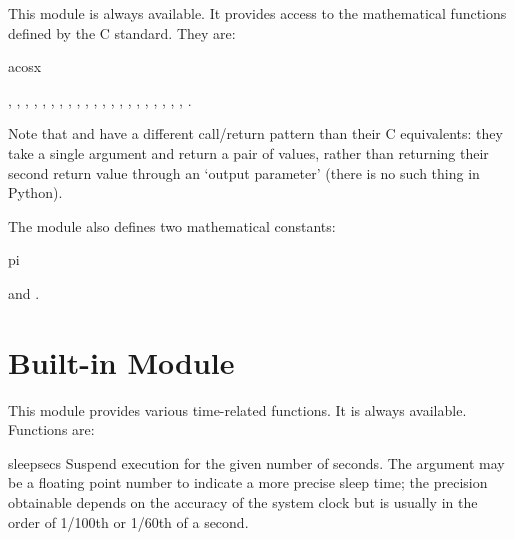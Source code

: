 \renewcommand{\indexsubitem}{(in module math)}
This module is always available.
It provides access to the mathematical functions defined by the C
standard.
They are:
\iftexi
\begin{funcdesc}{acos}{x}
\end{funcdesc}
\else
{},
,
,
,
,
,
,
,
,
,
,
,
,
,
,
,
,
,
,
,
,
.
\fi

Note that  and  have a different call/return
pattern than their C equivalents: they take a single argument and
return a pair of values, rather than returning their second return
value through an `output parameter' (there is no such thing in Python).

The module also defines two mathematical constants:
\iftexi
\begin{datadesc}{pi}
\end{datadesc}
\else
{} and .
\fi

\section{Built-in Module }

This module provides various time-related functions.
It is always available.
Functions are:

\renewcommand{\indexsubitem}{(in module time)}
\begin{funcdesc}{sleep}{secs}
Suspend execution for the given number of seconds.  The argument may
be a floating point number to indicate a more precise sleep time; the
precision obtainable depends on the accuracy of the system clock but
is usually in the order of 1/100th or 1/60th of a second.
\end{funcdesc}

